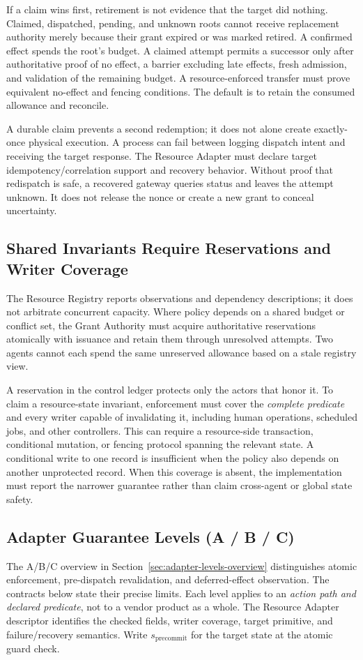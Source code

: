 If a claim wins first, retirement is not evidence that the target did nothing. Claimed, dispatched, pending, and unknown roots cannot receive replacement authority merely because their grant expired or was marked retired. A confirmed effect spends the root's budget. A claimed attempt permits a successor only after authoritative proof of no effect, a barrier excluding late effects, fresh admission, and validation of the remaining budget. A resource-enforced transfer must prove equivalent no-effect and fencing conditions. The default is to retain the consumed allowance and reconcile.

A durable claim prevents a second redemption; it does not alone create exactly-once physical execution. A process can fail between logging dispatch intent and receiving the target response. The Resource Adapter must declare target idempotency/correlation support and recovery behavior. Without proof that redispatch is safe, a recovered gateway queries status and leaves the attempt unknown. It does not release the nonce or create a new grant to conceal uncertainty.

\subsection{Shared Invariants Require Reservations and Writer Coverage}
The Resource Registry reports observations and dependency descriptions; it does not arbitrate concurrent capacity. Where policy depends on a shared budget or conflict set, the Grant Authority must acquire authoritative reservations atomically with issuance and retain them through unresolved attempts. Two agents cannot each spend the same unreserved allowance based on a stale registry view.

A reservation in the control ledger protects only the actors that honor it. To claim a resource-state invariant, enforcement must cover the \emph{complete predicate} and every writer capable of invalidating it, including human operations, scheduled jobs, and other controllers. This can require a resource-side transaction, conditional mutation, or fencing protocol spanning the relevant state. A conditional write to one record is insufficient when the policy also depends on another unprotected record. When this coverage is absent, the implementation must report the narrower guarantee rather than claim cross-agent or global state safety.

\subsection{Adapter Guarantee Levels (A / B / C)}
\label{sec:adapter-levels}
The A/B/C overview in Section~\ref{sec:adapter-levels-overview} distinguishes atomic enforcement, pre-dispatch revalidation, and deferred-effect observation. The contracts below state their precise limits. Each level applies to an \emph{action path and declared predicate}, not to a vendor product as a whole. The Resource Adapter descriptor identifies the checked fields, writer coverage, target primitive, and failure/recovery semantics. Write $s_{\mathrm{precommit}}$ for the target state at the atomic guard check.

